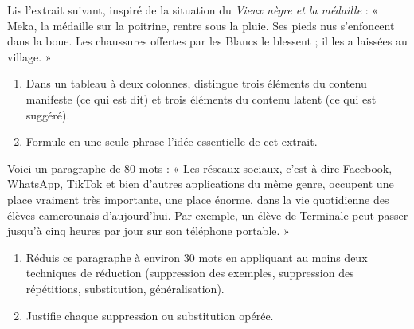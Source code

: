 \documentclass[11pt]{article}
\newcommand{\cle}[1]{{\popxbold\color{popdark}#1}}
\newcounter{popsec}
\newcounter{popsub}
\newcommand{\courssub}[1]{%
  \stepcounter{popsub}%
  \par\vspace{9pt}\noindent{\popxbold\fontsize{11.5}{13}\selectfont\color{popink}{\color{poporange}\thepopsec.\thepopsub}\hspace{6pt}#1}\par\nopagebreak\vspace{4pt}
}
\begin{document}
\begin{exercice}
Lis l'extrait suivant, inspiré de la situation du \emph{Vieux nègre et la médaille} : « Meka, la médaille sur la poitrine, rentre sous la pluie. Ses pieds nus s'enfoncent dans la boue. Les chaussures offertes par les Blancs le blessent ; il les a laissées au village. »
\begin{enumerate}
\item Dans un tableau à deux colonnes, distingue trois éléments du \cle{contenu manifeste} (ce qui est dit) et trois éléments du \cle{contenu latent} (ce qui est suggéré).
\item Formule en une seule phrase l'idée essentielle de cet extrait.
\end{enumerate}
\end{exercice}

\begin{exercice}
Voici un paragraphe de 80 mots : « Les réseaux sociaux, c'est-à-dire Facebook, WhatsApp, TikTok et bien d'autres applications du même genre, occupent une place vraiment très importante, une place énorme, dans la vie quotidienne des élèves camerounais d'aujourd'hui. Par exemple, un élève de Terminale peut passer jusqu'à cinq heures par jour sur son téléphone portable. »
\begin{enumerate}
\item Réduis ce paragraphe à environ 30 mots en appliquant au moins deux techniques de réduction (suppression des exemples, suppression des répétitions, substitution, généralisation).
\item Justifie chaque suppression ou substitution opérée.
\end{enumerate}
\end{exercice}

\courssub{Je me prépare au Bac}
\end{document}
